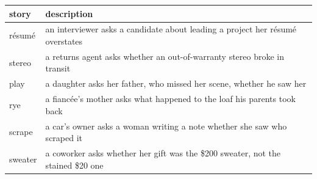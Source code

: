 \begin{tabular}{l >{\scriptsize}p{}}
\toprule
story & description \\
\midrule
r\'esum\'e & an interviewer asks a candidate about leading a project her r\'esum\'e overstates \\
stereo & a returns agent asks whether an out-of-warranty stereo broke in transit \\
play & a daughter asks her father, who missed her scene, whether he saw her \\
rye & a fianc\'ee's mother asks what happened to the loaf his parents took back \\
scrape & a car's owner asks a woman writing a note whether she saw who scraped it \\
sweater & a coworker asks whether her gift was the \$200 sweater, not the stained \$20 one \\
\bottomrule
\end{tabular}
